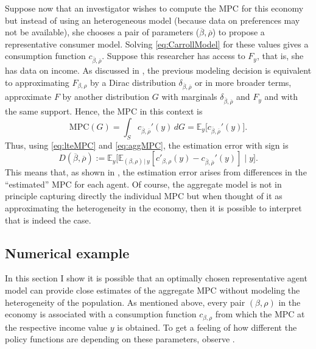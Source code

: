 \documentclass[english, a4paper, 12pt]{article}
\begin{document}
Suppose now that an investigator wishes to compute the MPC for this economy but instead of using an heterogeneous model (because data on preferences may not be available), she chooses a pair of parameters ($\overline{\beta}, \overline{\rho}$) to propose a representative consumer model. Solving \eqref{eq:CarrollModel} for these values gives a consumption function $c_{\overline{\beta}, \overline{\rho}}$. Suppose this researcher has access to $F_{y}$, that is, she has data on income. As discussed in , the previous modeling decision is equivalent to approximating $F_{\beta,\rho}$ by a Dirac distribution $\delta_{\overline{\beta},\overline{\rho}}$ or in more broader terms, approximate $F$ by another distribution $G$ with marginals $\delta_{\overline{\beta},\overline{\rho}}$ and $F_{y}$ and with the same support. Hence, the MPC in this context is
	\begin{equation} \label{eq:aggMPC}
		\mathrm{MPC}(G) 
			= \int_{S} c_{\overline{\beta},\overline{\rho}}'(y) \, dG 
			= \mathbb{E}_{y}\Big[ c_{\overline{\beta},\overline{\rho}}'(y) \Big].
	\end{equation}	
Thus, using \eqref{eq:lteMPC} and \eqref{eq:aggMPC}, the estimation error with sign is
	$$D(\overline{\beta}, \overline{\rho})
		:=	\mathbb{E}_{y}\Big[ \mathbb{E}_{(\beta,\rho) \, | \, y}[c'_{\beta,\rho}(y) -  c_{\overline{\beta},\overline{\rho}}'(y) ] \; \Big| \; y \Big].$$
This means that, as shown in , the estimation error arises from differences in the ``estimated'' MPC for each agent. Of course, the aggregate model is not in principle capturing directly the individual MPC but when thought of it as approximating the heterogeneity in the economy, then it is possible to interpret that is indeed the case.


\subsection{Numerical example}
In this section I show it is possible that an optimally chosen representative agent model can provide close estimates of the aggregate MPC without modeling the heterogeneity of the population. As mentioned above, every pair $(\beta,\rho)$ in the economy is associated with a consumption function $c_{\beta,\rho}$ from which the MPC at the respective income value $y$ is obtained. To get a feeling of how different the policy functions are depending on these parameters, observe . 
\end{document}
